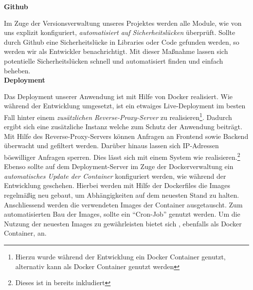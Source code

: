 \textbf{Github}

Im Zuge der Versionsverwaltung unseres Projektes werden alle Module, wie von uns explizit konfiguriert, \textit{automatisiert auf Sicherheitslücken} überprüft.
Sollte durch Github eine Sicherheitslücke in Libraries oder Code gefunden werden, so werden wir als Entwickler benachrichtigt.
Mit dieser Maßnahme lassen sich potentielle Sicherheitslücken schnell und automatisiert finden und einfach beheben.\\

\textbf{Deployment}

Das Deployment unserer Anwendung ist mit Hilfe von Docker realisiert.
Wie während der Entwicklung umgesetzt, ist ein etwaiges Live-Deployment im besten Fall hinter einem \textit{zusätzlichen Reverse-Proxy-Server} zu realisieren\footnote{Hierzu wurde während der Entwicklung ein \cite{swag} Docker Container genutzt, alternativ kann \cite{traefik} als Docker Container genutzt werden}.
Dadurch ergibt sich eine zusätzliche Instanz welche zum Schutz der Anwendung beiträgt. Mit Hilfe des Reverse-Proxy-Servers können Anfragen an Frontend sowie Backend überwacht und gefiltert werden.
Darüber hinaus lassen sich IP-Adressen böswilliger Anfragen sperren.
Dies lässt sich mit einem System wie \cite{Fail2Ban} realisieren.\footnote{Dieses ist in \cite{swag} bereits inkludiert}\\
Ebenso sollte auf dem Deployment-Server im Zuge der Dockerverwaltung ein \textit{automatisches Update der Container} konfiguriert werden, wie während der Entwicklung geschehen.
Hierbei werden mit Hilfe der Dockerfiles die Images regelmäßig neu gebaut, um Abhängigkeiten auf dem neuesten Stand zu halten.
Anschliessend werden die verwendeten Images der Container ausgetauscht.
Zum automatisierten Bau der Images, sollte ein \enquote{Cron-Job} genutzt werden.
Um die Nutzung der neuesten Images zu gewährleisten bietet sich \cite{watchtower}, ebenfalls als Docker Container, an.
